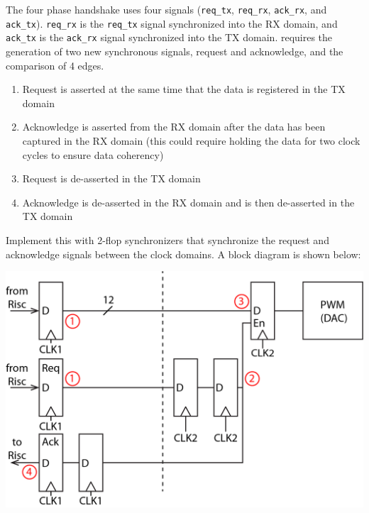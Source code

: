 \documentclass[11pt]{article}
\begin{document}
The four phase handshake uses four signals (\verb|req_tx|, \verb|req_rx|, \verb|ack_rx|, and \verb|ack_tx|).
\verb|req_rx| is the \verb|req_tx| signal synchronized into the RX domain, and \verb|ack_tx| is the \verb|ack_rx| signal synchronized into the TX domain.
requires the generation of two new synchronous signals, request and acknowledge, and the comparison of 4 edges.
\begin{enumerate}
  \item Request is asserted at the same time that the data is registered in the TX domain
  \item Acknowledge is asserted from the RX domain after the data has been captured in the RX domain (this could require holding the data for two clock cycles to ensure data coherency)
  \item Request is de-asserted in the TX domain
  \item Acknowledge is de-asserted in the RX domain and is then de-asserted in the TX domain
\end{enumerate}

Implement this with 2-flop synchronizers that synchronize the request and acknowledge signals between the clock domains.
A block diagram is shown below:

\begin{center}
  \includegraphics[width=\textwidth/2]{images/fourPhase_1.png}
\end{center}
\end{document}
